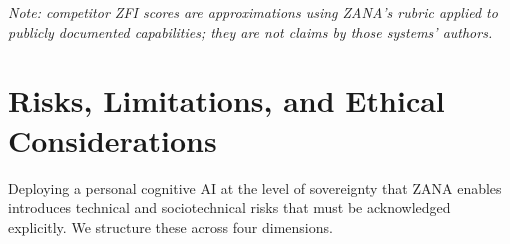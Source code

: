 \documentclass[12pt,a4paper]{article}
\begin{document}
\begin{table}[H]
\centering
\caption{Comparative Analysis (ZFI rubric applied to publicly documented capabilities)}

\medskip
\noindent\textit{Note: competitor ZFI scores are approximations using ZANA's rubric applied
to publicly documented capabilities; they are not claims by those systems' authors.}
\end{table}

\section{Risks, Limitations, and Ethical Considerations}
\label{sec:risks}

Deploying a personal cognitive AI at the level of sovereignty that ZANA enables introduces
technical and sociotechnical risks that must be acknowledged explicitly. We structure
these across four dimensions.
\end{document}
